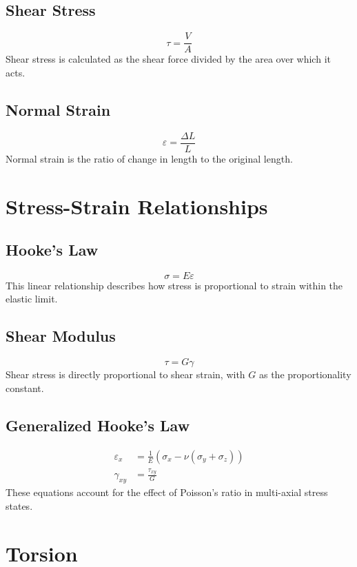 \documentclass[12pt]{article}
\begin{document}
\subsection{Shear Stress}
\begin{equation}
\tau = \frac{V}{A}
\end{equation}
Shear stress is calculated as the shear force divided by the area over which it acts.

\subsection{Normal Strain}
\begin{equation}
\varepsilon = \frac{\Delta L}{L}
\end{equation}
Normal strain is the ratio of change in length to the original length.

\section{Stress-Strain Relationships}
\subsection{Hooke's Law}
\begin{equation}
\sigma = E \varepsilon
\end{equation}
This linear relationship describes how stress is proportional to strain within the elastic limit.

\subsection{Shear Modulus}
\begin{equation}
\tau = G \gamma
\end{equation}
Shear stress is directly proportional to shear strain, with $G$ as the proportionality constant.

\subsection{Generalized Hooke's Law}
\begin{align}
\varepsilon_x &= \frac{1}{E} \left( \sigma_x - \nu(\sigma_y + \sigma_z) \right) \\
\gamma_{xy} &= \frac{\tau_{xy}}{G}
\end{align}
These equations account for the effect of Poisson's ratio in multi-axial stress states.

\section{Torsion}
\end{document}
